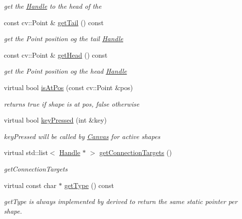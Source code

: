 \begin{DoxyCompactItemize}
\begin{DoxyCompactList}\small\item\em get the \hyperlink{classcanvascv_1_1Handle}{Handle} to the head of the \end{DoxyCompactList}\item 
const cv\+::\+Point \& \hyperlink{classcanvascv_1_1Line_a0f3a3d49c01ac13e45496f197a0b0ab8}{get\+Tail} () const \hypertarget{classcanvascv_1_1Line_a0f3a3d49c01ac13e45496f197a0b0ab8}{}\label{classcanvascv_1_1Line_a0f3a3d49c01ac13e45496f197a0b0ab8}

\begin{DoxyCompactList}\small\item\em get the Point position og the tail \hyperlink{classcanvascv_1_1Handle}{Handle} \end{DoxyCompactList}\item 
const cv\+::\+Point \& \hyperlink{classcanvascv_1_1Line_aa0dfcc4fcfbc07eefac5b962f12c7fb0}{get\+Head} () const \hypertarget{classcanvascv_1_1Line_aa0dfcc4fcfbc07eefac5b962f12c7fb0}{}\label{classcanvascv_1_1Line_aa0dfcc4fcfbc07eefac5b962f12c7fb0}

\begin{DoxyCompactList}\small\item\em get the Point position og the head \hyperlink{classcanvascv_1_1Handle}{Handle} \end{DoxyCompactList}\item 
virtual bool \hyperlink{classcanvascv_1_1Line_aa7bd63d71cc0f63cef68b397c0c24168}{is\+At\+Pos} (const cv\+::\+Point \&pos)\hypertarget{classcanvascv_1_1Line_aa7bd63d71cc0f63cef68b397c0c24168}{}\label{classcanvascv_1_1Line_aa7bd63d71cc0f63cef68b397c0c24168}

\begin{DoxyCompactList}\small\item\em returns true if shape is at pos, false otherwise \end{DoxyCompactList}\item 
virtual bool \hyperlink{classcanvascv_1_1Line_a4059736cde05ffc90dda8ed1ff4f9ba2}{key\+Pressed} (int \&key)
\begin{DoxyCompactList}\small\item\em key\+Pressed will be called by \hyperlink{classcanvascv_1_1Canvas}{Canvas} for active shapes \end{DoxyCompactList}\item 
virtual std\+::list$<$ \hyperlink{classcanvascv_1_1Handle}{Handle} $\ast$ $>$ \hyperlink{classcanvascv_1_1Line_a4a4293ae8f9600ee7f9d3a8089e6965a}{get\+Connection\+Targets} ()
\begin{DoxyCompactList}\small\item\em get\+Connection\+Targets \end{DoxyCompactList}\item 
virtual const char $\ast$ \hyperlink{classcanvascv_1_1Line_a863306159fbca892702fd3d0047b63c3}{get\+Type} () const 
\begin{DoxyCompactList}\small\item\em get\+Type is always implemented by derived to return the same static pointer per shape. \end{DoxyCompactList}\end{DoxyCompactItemize}
